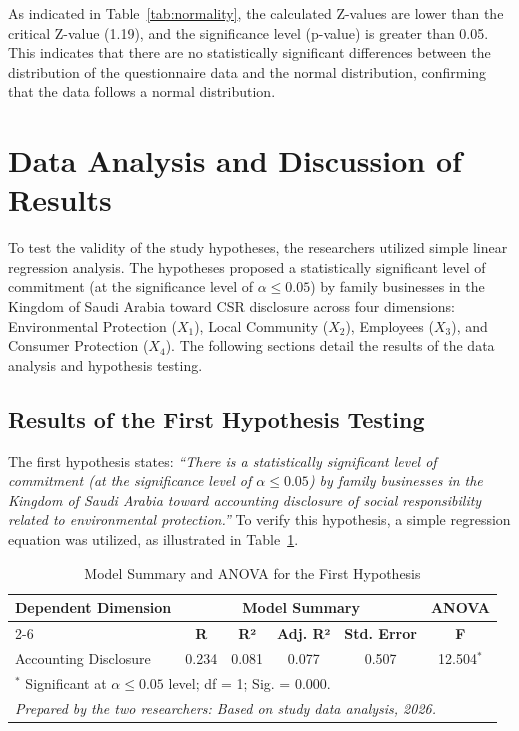 \documentclass[10pt]{NSP1}
\begin{document}
	As indicated in Table~\ref{tab:normality}, the calculated Z-values are lower than the critical Z-value (1.19), and the significance level (p-value) is greater than 0.05. This indicates that there are no statistically significant differences between the distribution of the questionnaire data and the normal distribution, confirming that the data follows a normal distribution.
	
	\section{Data Analysis and Discussion of Results}
	
	To test the validity of the study hypotheses, the researchers utilized simple linear regression analysis. The hypotheses proposed a statistically significant level of commitment (at the significance level of \(\alpha \leq 0.05\)) by family businesses in the Kingdom of Saudi Arabia toward CSR disclosure across four dimensions: Environmental Protection (\(X_1\)), Local Community (\(X_2\)), Employees (\(X_3\)), and Consumer Protection (\(X_4\)). The following sections detail the results of the data analysis and hypothesis testing.
	
	\subsection{Results of the First Hypothesis Testing}
	
	The first hypothesis states: \emph{``There is a statistically significant level of commitment (at the significance level of \(\alpha \leq 0.05\)) by family businesses in the Kingdom of Saudi Arabia toward accounting disclosure of social responsibility related to environmental protection.''} To verify this hypothesis, a simple regression equation was utilized, as illustrated in Table~\ref{tab:h1}.
	
	\begin{table}[H]
		\centering
		\caption{Model Summary and ANOVA for the First Hypothesis}
		\label{tab:h1}
		\vspace{5pt}
		\small
		\begin{tabular}{lccccc}
			\hline
			\multirow{2}{*}{\textbf{Dependent Dimension}} & \multicolumn{4}{c}{\textbf{Model Summary}} & \multicolumn{1}{c}{\textbf{ANOVA}} \\
			\cline{2-6}
			& \textbf{R} & \textbf{R²} & \textbf{Adj. R²} & \textbf{Std. Error} & \textbf{F} \\
			\hline
			Accounting Disclosure & 0.234 & 0.081 & 0.077 & 0.507 & 12.504\(^{*}\) \\
			\hline
			\multicolumn{6}{l}{\footnotesize \(^{*}\) Significant at \(\alpha \leq 0.05\) level; df = 1; Sig. = 0.000.} \\
			\multicolumn{6}{l}{\footnotesize \textit{Prepared by the two researchers: Based on study data analysis, 2026.}} \\
		\end{tabular}
	\end{table}
	
\end{document}
